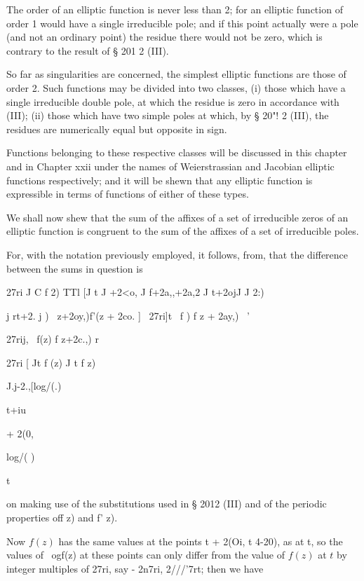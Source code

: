 The order of an elliptic function is never less than 2; for an
elliptic function of order 1 would have a single irreducible pole;
and if this point actually were a pole (and not an ordinary point) the
residue there would not be zero, which is contrary to the result of §
201 2 (III).

So far as singularities are concerned, the simplest elliptic functions
are those of order 2. Such functions may be divided into two classes,
(i) those which have a single irreducible double pole, at which the
residue is zero in accordance with (III); (ii) those which
have two simple poles at which, by § 20"! 2 (III), the residues are
numerically equal but opposite in sign.

Functions belonging to these respective classes will be discussed in
this chapter and in Chapter xxii under the names of Weierstrassian and
Jacobian elliptic functions respectively; and it will be shewn that
any elliptic function is expressible in terms of functions of either
of these types.

%
%


We shall now shew that the sum of the affixes of a set of irreducible
zeros of an elliptic function is congruent to the sum of the affixes
of a set of irreducible poles.

For, with the notation previously employed, it follows, from,
that the difference between the sums in question is

27ri J C f 2) TTl [J t J +2<o, J f+2a,,+2a,2 J t+2ojJ J 2:)

  j rt+2. j ) \ z+2oy,)f'(z + 2co. ] ~27ri]t \ f ) f z + 2ay,) \ '

27rij, \ f(z) f z+2c.,) r

27ri [ Jt f (z) J t f z)

J.j-2.,[log/(.)

t+iu

+ 2(0,

log/( )

t

on making use of the substitutions used in § 2012 (III) and of the
periodic properties off z) and f' z).

Now $f(z)$ has the same values at the points t + 2(Oi, t 4-20), as at t,
so the values of \ ogf(z) at these points can only differ from the
value of $f(z)$ at $t$ by integer multiples of 27ri, say - 2n7ri,
2///'7rt; then we have

